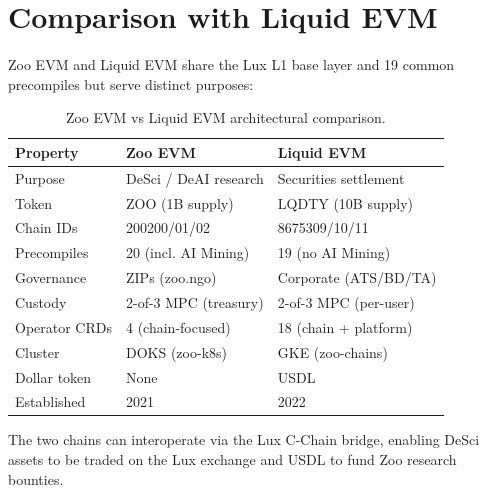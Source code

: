 \section{Comparison with Liquid EVM}


Zoo EVM and Liquid EVM share the Lux L1 base layer and 19 common precompiles but serve distinct purposes:

\begin{table}[h]
\centering
\small
\begin{tabular}{lll}
\toprule
\textbf{Property} & \textbf{Zoo EVM} & \textbf{Liquid EVM} \\
\midrule
Purpose & DeSci / DeAI research & Securities settlement \\
Token & ZOO (1B supply) & LQDTY (10B supply) \\
Chain IDs & 200200/01/02 & 8675309/10/11 \\
Precompiles & 20 (incl. AI Mining) & 19 (no AI Mining) \\
Governance & ZIPs (zoo.ngo) & Corporate (ATS/BD/TA) \\
Custody & 2-of-3 MPC (treasury) & 2-of-3 MPC (per-user) \\
Operator CRDs & 4 (chain-focused) & 18 (chain + platform) \\
Cluster & DOKS (zoo-k8s) & GKE (zoo-chains) \\
Dollar token & None & USDL \\
Established & 2021 & 2022 \\
\bottomrule
\end{tabular}
\caption{Zoo EVM vs Liquid EVM architectural comparison.}
\end{table}

The two chains can interoperate via the Lux C-Chain bridge, enabling DeSci assets to be traded on the Lux exchange and USDL to fund Zoo research bounties.

